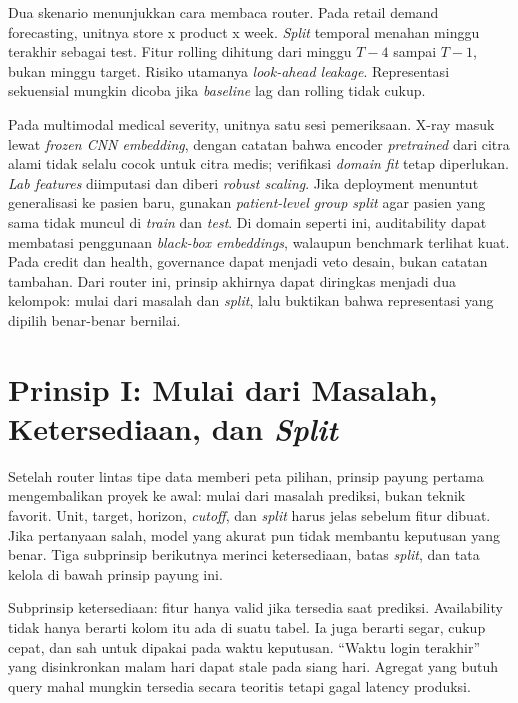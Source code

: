 Dua skenario menunjukkan cara membaca router. Pada retail demand forecasting, unitnya store x product x week. \emph{Split} temporal menahan minggu terakhir sebagai test. Fitur rolling dihitung dari minggu \(T{-}4\) sampai \(T{-}1\), bukan minggu target. Risiko utamanya \emph{look-ahead leakage}. Representasi sekuensial mungkin dicoba jika \emph{baseline} lag dan rolling tidak cukup.

Pada multimodal medical severity, unitnya satu sesi pemeriksaan. X-ray masuk lewat \emph{frozen CNN embedding}, dengan catatan bahwa encoder \emph{pretrained} dari citra alami tidak selalu cocok untuk citra medis; verifikasi \emph{domain fit} tetap diperlukan. \emph{Lab features} diimputasi dan diberi \emph{robust scaling}. Jika deployment menuntut generalisasi ke pasien baru, gunakan \emph{patient-level group split} agar pasien yang sama tidak muncul di \emph{train} dan \emph{test}. Di domain seperti ini, auditability dapat membatasi penggunaan \emph{black-box embeddings}, walaupun benchmark terlihat kuat. Pada credit dan health, governance dapat menjadi veto desain, bukan catatan tambahan. Dari router ini, prinsip akhirnya dapat diringkas menjadi dua kelompok: mulai dari masalah dan \emph{split}, lalu buktikan bahwa representasi yang dipilih benar-benar bernilai.

\section{\texorpdfstring{Prinsip I: Mulai dari Masalah, Ketersediaan, dan \emph{Split}}{Prinsip I: Mulai dari Masalah, Ketersediaan, dan Split}}\label{prinsip-i-mulai-dari-masalah-ketersediaan-dan-split}

Setelah router lintas tipe data memberi peta pilihan, prinsip payung pertama mengembalikan proyek ke awal: mulai dari masalah prediksi, bukan teknik favorit. Unit, target, horizon, \emph{cutoff}, dan \emph{split} harus jelas sebelum fitur dibuat. Jika pertanyaan salah, model yang akurat pun tidak membantu keputusan yang benar. Tiga subprinsip berikutnya merinci ketersediaan, batas \emph{split}, dan tata kelola di bawah prinsip payung ini.

Subprinsip ketersediaan: fitur hanya valid jika tersedia saat prediksi. Availability tidak hanya berarti kolom itu ada di suatu tabel. Ia juga berarti segar, cukup cepat, dan sah untuk dipakai pada waktu keputusan. ``Waktu login terakhir'' yang disinkronkan malam hari dapat stale pada siang hari. Agregat yang butuh query mahal mungkin tersedia secara teoritis tetapi gagal latency produksi.

